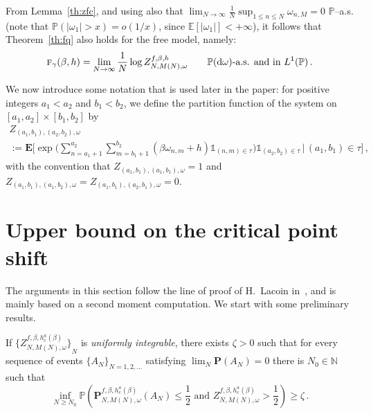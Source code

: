 \documentclass[10pt]{amsart}
\theoremstyle{definition}\newtheorem{defi}[theo]{Definition}\newtheorem{rema}[theo]{Remark}\newtheorem{exam}[theo]{Example}\newtheorem{exem}[theo]{Example}\newtheorem{nota}[theo]{Notation}
\newcommand{\gb}{\beta}
\newcommand{\go}{\omega}
\newcommand{\unbf}%
{\mathds{1}}
\newcommand{\dd}{\mathrm{d}}
\newcommand{\tf}{\textsc{f}} %
\newcommand{\bP}{\ensuremath{\mathbf{P}}}
\newcommand{\bE}{\ensuremath{\mathbf{E}}}
\newcommand{\bbE}{\ensuremath{\mathbb{E}}}
\newcommand{\bbN}{\ensuremath{\mathbb{N}}}
\newcommand{\bbP}{\ensuremath{\mathbb{P}}}
\begin{document}
From Lemma~\ref{th:zfc}, and using also that $\lim_{N\to\infty} \frac1N \sup_{1\leq n\leq N} \go_{n,M} = 0$ $\bbP$--a.s. (note that $\bbP(|\go_1|>x) =o(1/x)$, since $\bbE[|\go_1|]<+\infty$), it follows that Theorem~\ref{th:fq} also holds for the free model, namely:
\begin{equation}\label{eq:saf.2}
\tf_{\gamma}(\beta,h) =\lim_{N\to\infty} \frac{1}{N} \log Z^{f,\gb,h}_{N,M(N),\omega} \qquad \bbP(\dd \go)\text{-a.s. and in } L^1(\bbP)\,.
\end{equation}

\goodbreak
We now introduce some notation that is used later in the paper: for positive integers $a_1 < a_2$ and $b_1 < b_2$, we define the partition function of the system on $[a_1,a_2] \times [b_1,b_2]$ by
\begin{multline}\label{eq:pp}
Z_{(a_1,b_1),(a_2,b_2),\omega}\\
:= \bE \bigg[\exp \bigg(\sum_{n=a_1+1}^{a_2} \sum_{m=b_1+1}^{b_2} (\beta \omega_{n,m} +h) \unbf_{(n,m) \in \tau} \bigg) \unbf_{(a_2,b_2)\in \tau}\,\bigg|\,(a_1,b_1) \in \tau \bigg]\,,
\end{multline}
with the convention that $Z_{(a_1,b_1),(a_1,b_1),\omega} = 1$ and $ Z_{(a_1,b_1),(a_1,b_2),\omega}= Z_{(a_1,b_1),(a_2,b_1),\omega}=0$.



\section{Upper bound on the critical point shift}\label{sec:irrel}

The arguments in this section follow the line of proof of H.~Lacoin in~\cite{cf:Lac}, and is mainly based on a second moment computation. We start with some preliminary results.

\begin{prop}\label{th:unint1}
If ${ \lbrace {Z^{f,\gb,h_c^{a}(\gb)}_{N,M(N),\omega}} \rbrace}_N$ is \emph{uniformly integrable}, there exists $\zeta >0$ such that for every sequence of events $\{A_N\}_{N=1, 2, \ldots}$ satisfying $\lim_{N} \bP(A_N)=0$ there is $N_0\in \bbN $ such that
\begin{equation}\label{eq:unint1}
\inf_{N \ge N_0}
\bbP \left(\bP^{f,\gb,h_c^{a}(\gb)}_{N,M(N),\omega} (A_N)\le \frac{1}{2}
\text{ and } Z^{f,\gb,h_c^{a}(\gb)}_{N,M(N),\omega} > \frac{1}{2} \right) \ge\zeta\,.
\end{equation}
\end{prop}
\end{document}
